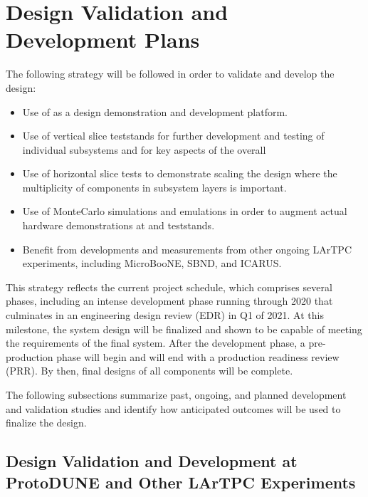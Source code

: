 \section{Design Validation and Development Plans}
\label{sec:fd-daq:validation}

The following strategy will be followed in order to validate and
develop the    design:
\begin{itemize}
\item Use of  as a design demonstration and
  development platform. 
\item Use of vertical slice teststands for further development and testing of
  individual  subsystems and for key aspects of the
  overall 
\item Use of horizontal slice tests to demonstrate scaling the design
  where the multiplicity of components in subsystem layers is important.
\item Use of  MonteCarlo simulations and emulations in order
  to augment actual hardware demonstrations at  and teststands.
\item Benefit from developments and measurements from other ongoing
  LArTPC experiments, including MicroBooNE, SBND, and ICARUS.
\end{itemize}

This strategy reflects the current  project schedule, which
comprises several phases, including an intense development phase
running through 2020 that culminates in an engineering design
review (EDR) in Q1 of 2021. At this milestone, the system design will be
finalized and shown to be capable of meeting the requirements of the
final  system. After the development phase, a
pre-production phase will begin and will end with a production readiness
review (PRR). By then, final designs of all components
will be complete.

The following subsections summarize past, ongoing, and planned
development and validation studies and identify how anticipated outcomes
will be used to finalize the  design.

\subsection{Design Validation and Development at ProtoDUNE and Other
  LArTPC Experiments}

\label{sec:fd-daq:protodune}

